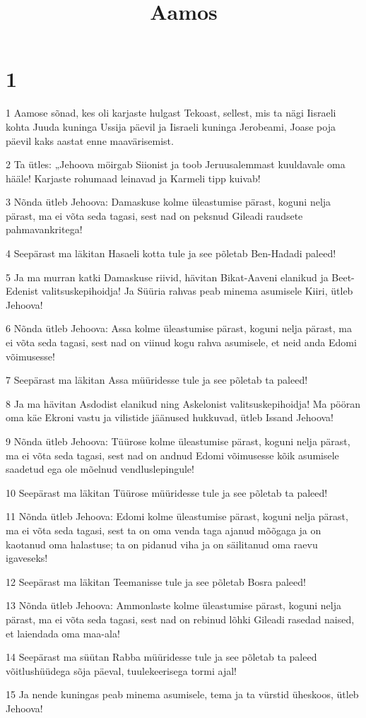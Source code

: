 

\title{Aamos}

\chapter{1}

\par 1 Aamose sõnad, kes oli karjaste hulgast Tekoast, sellest, mis ta nägi Iisraeli kohta Juuda kuninga Ussija päevil ja Iisraeli kuninga Jerobeami, Joase poja päevil kaks aastat enne maavärisemist.
\par 2 Ta ütles: „Jehoova möirgab Siionist ja toob Jeruusalemmast kuuldavale oma hääle! Karjaste rohumaad leinavad ja Karmeli tipp kuivab!
\par 3 Nõnda ütleb Jehoova: Damaskuse kolme üleastumise pärast, koguni nelja pärast, ma ei võta seda tagasi, sest nad on peksnud Gileadi raudsete pahmavankritega!
\par 4 Seepärast ma läkitan Hasaeli kotta tule ja see põletab Ben-Hadadi paleed!
\par 5 Ja ma murran katki Damaskuse riivid, hävitan Bikat-Aaveni elanikud ja Beet-Edenist valitsuskepihoidja! Ja Süüria rahvas peab minema asumisele Kiiri, ütleb Jehoova!
\par 6 Nõnda ütleb Jehoova: Assa kolme üleastumise pärast, koguni nelja pärast, ma ei võta seda tagasi, sest nad on viinud kogu rahva asumisele, et neid anda Edomi võimusesse!
\par 7 Seepärast ma läkitan Assa müüridesse tule ja see põletab ta paleed!
\par 8 Ja ma hävitan Asdodist elanikud ning Askelonist valitsuskepihoidja! Ma pööran oma käe Ekroni vastu ja vilistide jäänused hukkuvad, ütleb Issand Jehoova!
\par 9 Nõnda ütleb Jehoova: Tüürose kolme üleastumise pärast, koguni nelja pärast, ma ei võta seda tagasi, sest nad on andnud Edomi võimusesse kõik asumisele saadetud ega ole mõelnud vendluslepingule!
\par 10 Seepärast ma läkitan Tüürose müüridesse tule ja see põletab ta paleed!
\par 11 Nõnda ütleb Jehoova: Edomi kolme üleastumise pärast, koguni nelja pärast, ma ei võta seda tagasi, sest ta on oma venda taga ajanud mõõgaga ja on kaotanud oma halastuse; ta on pidanud viha ja on säilitanud oma raevu igaveseks!
\par 12 Seepärast ma läkitan Teemanisse tule ja see põletab Bosra paleed!
\par 13 Nõnda ütleb Jehoova: Ammonlaste kolme üleastumise pärast, koguni nelja pärast, ma ei võta seda tagasi, sest nad on rebinud lõhki Gileadi rasedad naised, et laiendada oma maa-ala!
\par 14 Seepärast ma süütan Rabba müüridesse tule ja see põletab ta paleed võitlushüüdega sõja päeval, tuulekeerisega tormi ajal!
\par 15 Ja nende kuningas peab minema asumisele, tema ja ta vürstid üheskoos, ütleb Jehoova!


